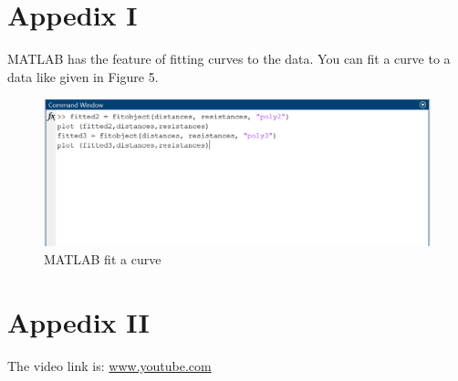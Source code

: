 \documentclass[letterpaper,12pt]{article}
\begin{document}
\section*{Appedix I}
MATLAB has the feature of fitting curves to the data. You can fit a curve to a data like given in Figure 5.
\begin{figure}[H]
	\centering
	\includegraphics[width=1\textwidth]{appendix.png}
	\caption{MATLAB fit a curve}
\end{figure}
\section*{Appedix II}
The video link is: \url{www.youtube.com}
\end{document}
